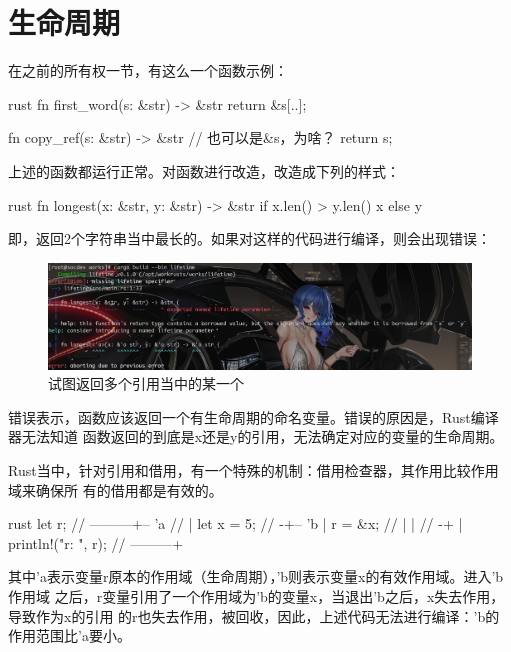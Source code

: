\section{生命周期}
在之前的所有权一节，有这么一个函数示例：
\begin{code-block}{rust}
fn first_word(s: &str) -> &str {
    return &s[..];
}

fn copy_ref(s: &str) -> &str {
    // 也可以是&s，为啥？
    return s;
}
\end{code-block}
上述的函数都运行正常。对函数进行改造，改造成下列的样式：
\begin{code-block}{rust}
fn longest(x: &str, y: &str) -> &str {
    if x.len() > y.len() {
        x
    } else {
        y
    }
}
\end{code-block}
即，返回2个字符串当中最长的。如果对这样的代码进行编译，则会出现错误：
\begin{figure}[H]
  \centering
  \includegraphics[scale=0.2]{rust_strref_err.png}
  \caption{试图返回多个引用当中的某一个}
  \label{fig:rust_strref_err}
\end{figure}
错误表示，函数应该返回一个有生命周期的命名变量。错误的原因是，Rust编译器无法知道
函数返回的到底是x还是y的引用，无法确定对应的变量的生命周期。

Rust当中，针对引用和借用，有一个特殊的机制：借用检查器，其作用比较作用域来确保所
有的借用都是有效的。
\begin{code-block}{rust}
{
    let r;                      // ---------+-- 'a
    {                            //          |
        let x = 5;             // -+-- 'b  |
        r = &x;                 //  |       |
    }                            // -+       |
    println!("r: {}", r); // ---------+
}
\end{code-block}

其中'a表示变量r原本的作用域（生命周期），'b则表示变量x的有效作用域。进入'b作用域
之后，r变量引用了一个作用域为'b的变量x，当退出'b之后，x失去作用，导致作为x的引用
的r也失去作用，被回收，因此，上述代码无法进行编译：'b的作用范围比'a要小。

